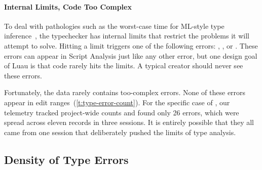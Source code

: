 \documentclass[english,submission,cleveref]{programming}
\begin{document}
\paragraph{Internal Limits, Code Too Complex}
\label{s:code-too-complex}

To deal with pathologies such as the worst-case time for ML-style type
inference~\cite{m-popl-1990,ktu-caap-1990}, the typechecker
has internal limits that restrict the problems it will attempt to solve.
Hitting a limit triggers one of the following errors:
,
, or
.
These errors can appear in Script Analysis just like any other
error, but one design goal of Luau is that code rarely hits the limits.
A typical creator should never see these errors.

Fortunately, the data rarely contains too-complex errors.
None of these errors appear in edit ranges~(\cref{t:type-error-count}).
For the specific case of , our telemetry tracked project-wide
counts and found only 26 errors, which were spread across eleven
records in three sessions.
It is entirely possible that they all came from one session that
deliberately pushed the limits of type analysis.


\subsection{Density of Type Errors}
\end{document}
